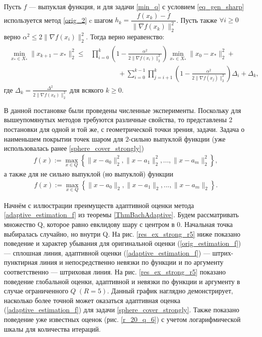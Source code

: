     \begin{theorem}\label{theorem1}
        Пусть $f$ --- выпуклая функция, и для задачи \eqref{min_q} с условием \eqref{eq_gen_sharp} используется метод \eqref{orig_2} c шагом
        $h_k = \dfrac{f(x_k) - \overline{f}}{\| \nabla f(x_k) \|_2^2}$. Пусть также $\forall i \geq 0$ верно $\alpha^2 \leq 2 \| \nabla f(x_i) \|_2^2$. Тогда верно неравенство:
        \begin{gather}\label{adaptive_estimate}
            \begin{aligned}
            \min_{x_* \in X_*} \|x_{k+1} - x_* \|_2^2 \leq &  \prod_{i=0}^k \left ( 1 - \frac{\alpha^2}{2 \| \nabla f(x_i) \|_2^2} \right ) \min_{x_* \in X_*} \|x_0 - x_* \|_2^2 + \\& 
            \qquad \qquad + \sum_{i=0}^{k-1} \prod_{j=i+1}^k \left ( 1 - \frac{\alpha^2}{2 \| \nabla f(x_j) \|_2^2} \right )\Delta_i + \Delta_k,
            \end{aligned}
        \end{gather}
        где $\Delta_k = \frac{\Delta^2}{2 \| \nabla f(x_k) \|_2^2}$ для всякого $k \geqslant 0$.
    \end{theorem}


    В данной постановке были проведены численные эксперименты. Поскольку для вышеупомянутых методов требуются различные свойства, то представлены 2 постановки для одной и той же, с геометрической точки зрения, задачи. Задача о наименьшем покрытии точек шаром для $2$-сильно выпуклой функции (уже использовалась ранее \eqref{sphere_cover_strongly})
    \begin{gather}
        f(x) := \max_{x\in Q}\left\{\|x - a_0\|_2^2, \|x - a_1\|_2^2, ..., \|x - a_m\|_2^2\right\},
    \end{gather}
    а также для не сильно выпуклой (но выпуклой) функции
    \begin{gather}\label{sphere_cover}
        f(x) := \max_{x\in Q}\left\{\|x - a_0\|_2, \|x - a_1\|_2, ..., \|x - a_m\|_2\right\}.
    \end{gather}

    Начнём с иллюстрации преимуществ адаптивной оценки метода \eqref{adaptive_estimation_f} из теоремы \ref{ThmBachAdaptive}. Будем рассматривать множество Q, которое равно евклидову шару с центром в 0. Начальная точка выбиралась случайно, но внутри Q. На рис. \ref{res_ex_strong_r5} ниже показано поведение и характер убывания для оригинальной оценки (\ref{orig_estimation_f}) --- сплошная линия, адаптивной оценки (\ref{adaptive_estimation_f}) --- штрих-пунктирная линия и непосредственно невязки по функции и по аргументу соответственно --- штриховая линия. На рис. \ref{res_ex_strong_r5} показано поведение глобальной оценки, адаптивной и невязки по функции и аргументу в случае ограниченного $Q \;(R = 5)$. Данный график наглядно демонстрирует, насколько более точной может оказаться адаптивная оценка (\ref{adaptive_estimation_f}) для задачи \eqref{sphere_cover_strongly}. Также показано поведение уже известных оценок (рис. \ref{r_20_q_6}) с учетом логарифмической шкалы для количества итераций.

